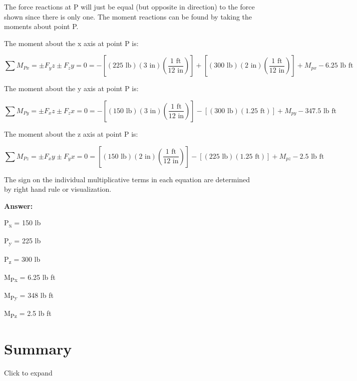 \documentclass[
  letterpaper,
  DIV=11,
  numbers=noendperiod]{scrreprt}
\begin{document}
\begin{tcolorbox}
The force reactions at P will just be equal (but opposite in direction)
to the force shown since there is only one. The moment reactions can be
found by taking the moments about point P.

The moment about the x axis at point P is:

\[
\sum M_{Px} = \pm F_yz \pm F_zy = 0 = -[(225 \text{ lb})(3 \text{ in})(\frac{1 \text{ ft}}{12 \text{ in}})]+[(300 \text{ lb})(2 \text{ in})(\frac{1 \text{ ft}}{12 \text{ in}})]+M_{px} -6.25 \text{ lb ft}
\]

The moment about the y axis at point P is:

\[
\sum M_{Py} = \pm F_xz \pm F_zx = 0 = -[(150 \text{ lb})(3 \text{ in})(\frac{1 \text{ ft}}{12 \text{ in}})]-[(300 \text{ lb})(1.25 \text{ ft})]+M_{py} -347.5 \text{ lb ft}
\]

The moment about the z axis at point P is:

\[
\sum M_{Pz} = \pm F_xy \pm F_yx = 0 = [(150 \text{ lb})(2 \text{ in})(\frac{1 \text{ ft}}{12 \text{ in}})]-[(225 \text{ lb})(1.25 \text{ ft})]+M_{pz} -2.5 \text{ lb ft}
\]

The sign on the individual multiplicative terms in each equation are
determined by right hand rule or visualization.

\textbf{Answer:}

P\textsubscript{x} = 150 lb

P\textsubscript{y} = 225 lb

P\textsubscript{z} = 300 lb

M\textsubscript{Px} = 6.25 lb ft

M\textsubscript{Py} = 348 lb ft

M\textsubscript{Pz} = 2.5 lb ft

\end{tcolorbox}

\section*{Summary}\label{summary}


Click to expand
\end{document}
